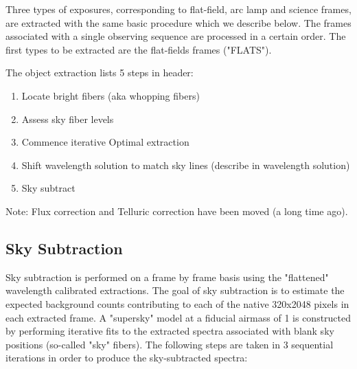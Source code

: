 Three types of exposures, corresponding to flat-field, arc lamp and science frames,
 are extracted with the same basic procedure
which we describe below.  The frames associated with a single observing sequence 
are processed in a certain order.  The first types to be extracted are the 
flat-fields frames ("FLATS").  

The object extraction lists 5 steps in header:

\begin{enumerate}
\item{Locate bright fibers (aka whopping fibers)}
\item{Assess sky fiber levels}
\item{Commence iterative Optimal extraction }
\item{Shift wavelength solution to match sky lines (describe in wavelength solution)}
\item{Sky subtract}

\end{enumerate}

Note: Flux correction and Telluric correction have been moved (a long time ago).


\subsection{Sky Subtraction}

Sky subtraction is performed on a frame by frame basis using the 
"flattened" wavelength calibrated extractions.  The goal of sky subtraction
is to estimate the expected background counts contributing to each of 
the native 320x2048 pixels in each extracted frame.  A "supersky" model 
at a fiducial airmass of 1 is constructed by performing iterative fits to
the extracted spectra associated with blank sky positions (so-called
"sky" fibers).   The following steps are taken in 3 sequential iterations
in order to produce the sky-subtracted spectra:

